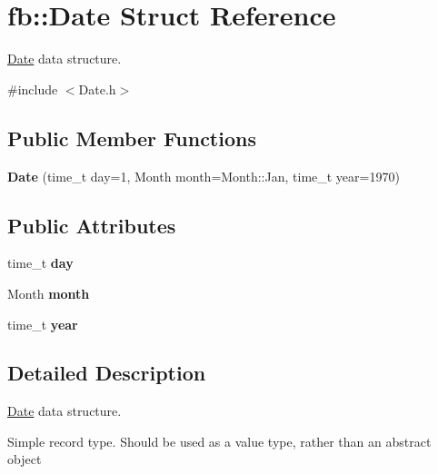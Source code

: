 \hypertarget{structfb_1_1_date}{\section{fb\+:\+:Date Struct Reference}
\label{structfb_1_1_date}
}


\hyperlink{structfb_1_1_date}{Date} data structure.  




{\ttfamily \#include $<$Date.\+h$>$}

\subsection*{Public Member Functions}
\begin{DoxyCompactItemize}
\item 
\hypertarget{structfb_1_1_date_afd4b4fd1e4f19641bd5af1814e28740e}{{\bfseries Date} (time\+\_\+t day=1, Month month=Month\+::\+Jan, time\+\_\+t year=1970)}\label{structfb_1_1_date_afd4b4fd1e4f19641bd5af1814e28740e}

\end{DoxyCompactItemize}
\subsection*{Public Attributes}
\begin{DoxyCompactItemize}
\item 
\hypertarget{structfb_1_1_date_aca51bed7ced0ec90a00380daca6d1774}{time\+\_\+t {\bfseries day}}\label{structfb_1_1_date_aca51bed7ced0ec90a00380daca6d1774}

\item 
\hypertarget{structfb_1_1_date_a67d62b4fd9c0050ffec876eb454719bc}{Month {\bfseries month}}\label{structfb_1_1_date_a67d62b4fd9c0050ffec876eb454719bc}

\item 
\hypertarget{structfb_1_1_date_a8b6c7c2160099c91acb1b573b4a001b8}{time\+\_\+t {\bfseries year}}\label{structfb_1_1_date_a8b6c7c2160099c91acb1b573b4a001b8}

\end{DoxyCompactItemize}


\subsection{Detailed Description}
\hyperlink{structfb_1_1_date}{Date} data structure. 

Simple record type. Should be used as a value type, rather than an abstract object


